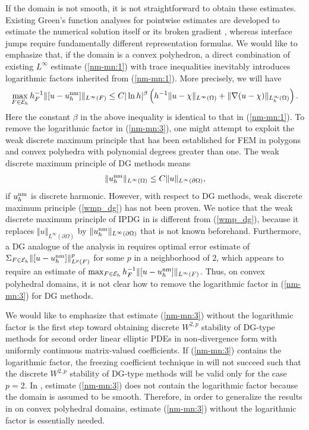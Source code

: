 \documentclass[1996/10/24]{amsart}
\theoremstyle{definition}
\numberwithin{equation}{section}
\begin{document}
If the domain is not smooth, it is not straightforward to obtain these estimates. Existing Green's function analyses for pointwise estimates
are developed to estimate the numerical solution itself or its broken gradient \cite{c2005, cc2005, cmy2021, g2006, lc2026}, whereas interface jumps require fundamentally different representation formulas. We would like to emphasize that, if the domain is a convex polyhedron, a direct combination of existing $L^\infty$ estimate (\ref{nm-mn:1})  with trace inequalities inevitably introduces logarithmic factors inherited from (\ref{nm-mn:1}).
More precisely, we will have
\begin{align}
\max_{F\in\mathcal E_h}h_F^{-1}\|[u - u_{h}^{{\rm nm}}]\|_{L^\infty(F)} \leq C \vert \ln h \vert^{\beta}
\left( h^{-1} \|u-\chi\|_{L^{\infty}(\Omega)}+\|\nabla(u-\chi)\|_{L_h^{\infty}(\Omega)}\right).
\label{nm-mn:3}
\end{align}
Here the constant $\beta$ in the above inequality is identical to that in (\ref{nm-mn:1}).
To remove the logarithmic factor in (\ref{nm-mn:3}), one might attempt to exploit the weak discrete maximum principle that has been established for FEM in polygons \cite{s1980} and convex polyhedra \cite{ll2020} with polynomial degrees greater than one. 
The weak discrete maximum principle of DG methods means 
\begin{align}
\label{wmp_dg}
\Vert u_{h}^{{\rm nm}} \Vert_{L^{\infty}(\Omega)} \leq C \Vert u \Vert_{L^{\infty}(\partial\Omega)},
\end{align}
if $u_{h}^{{\rm nm}}$ is discrete harmonic. However, with respect to DG methods, weak
discrete maximum principle (\ref{wmp_dg}) has not been proven. We notice that  
the weak discrete maximum principle of IPDG in \cite{ChibaSaito2019} is different from 
(\ref{wmp_dg}), because it replaces $\Vert u\Vert_{L^{\infty}(\partial\Omega)}$ by 
$\Vert u_{h}^{{\rm nm}}\Vert_{L^{\infty}(\partial\Omega)}$ that is not known beforehand.
Furthermore, a DG analogue of the analysis in \cite{ll2020} requires optimal error estimate of 
$\Sigma_{F\in \mathcal{E}_{h}}\Vert [u - u_{h}^{{\rm nm}}]\Vert_{L^{p}(F)}^{p}$ for some $p$ 
in a neighborhood of $2$, which appears to require an estimate of $\max_{F \in \mathcal{E}_{h}}h_{F}^{-1} 
\Vert [u-u_h^{{\rm nm}}] \Vert_{L^{\infty}(F)}$.
Thus, on convex polyhedral domains, it is not clear how to remove the logarithmic factor 
in (\ref{nm-mn:3}) for DG methods.

We would like to emphasize that estimate (\ref{nm-mn:3}) without the logarithmic factor
is the first step toward obtaining discrete
$W^{2,p}$ stability of DG-type methods for second order linear elliptic PDEs in non-divergence form
with uniformly continuous matrix-valued coefficients. If (\ref{nm-mn:3}) contains the logarithmic factor, the
freezing coefficient technique in \cite{fns2018} will not succeed such that the discrete  $W^{2,p}$ stability
of DG-type methods will be valid only for the case $p = 2$. In \cite{fns2018}, estimate (\ref{nm-mn:3})
does not contain the logarithmic factor because the domain is assumed to be smooth.
Therefore, in order to generalize the results in \cite{fns2018} on convex polyhedral domains, estimate
(\ref{nm-mn:3}) without the logarithmic factor is essentially needed.
\end{document}
